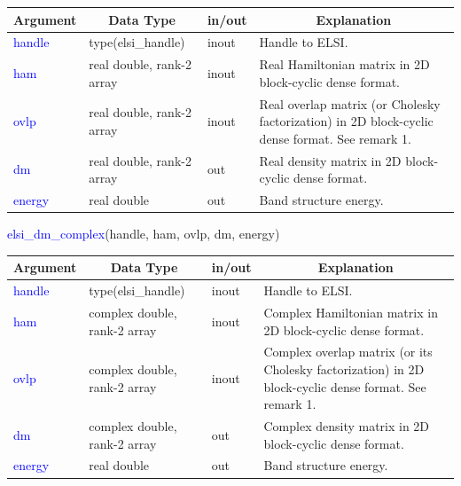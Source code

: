 \documentclass{report}
\begin{document}
\begin{tabular}[]{|p{20mm}|p{45mm}|p{15mm}|p{85mm}|}
\hline
\multicolumn{1}{|c|}{\textbf{Argument}} & \multicolumn{1}{c|}{\textbf{Data Type}} & \multicolumn{1}{c|}{\textbf{in/out}} & \multicolumn{1}{c|}{\textbf{Explanation}}\\
\hline
\textcolor{blue}{handle} & type(elsi\_handle)        & inout & Handle to ELSI.\\
\hline
\textcolor{blue}{ham}    & real double, rank-2 array & inout & Real Hamiltonian matrix in 2D block-cyclic dense format.\\
\hline
\textcolor{blue}{ovlp}   & real double, rank-2 array & inout & Real overlap matrix (or Cholesky factorization) in 2D block-cyclic dense format.  See remark 1.\\
\hline
\textcolor{blue}{dm}     & real double, rank-2 array & out   & Real density matrix in 2D block-cyclic dense format.\\
\hline
\textcolor{blue}{energy} & real double               & out   & Band structure energy.\\
\hline
\end{tabular}

\begin{labeling}{\hspace{6cm}}
\item [\hspace{0.3cm} \textcolor{blue}{elsi\_dm\_complex}(handle, ham, ovlp, dm, energy)]
\end{labeling}

\begin{tabular}[]{|p{20mm}|p{45mm}|p{15mm}|p{85mm}|}
\hline
\multicolumn{1}{|c|}{\textbf{Argument}} & \multicolumn{1}{c|}{\textbf{Data Type}} & \multicolumn{1}{c|}{\textbf{in/out}} & \multicolumn{1}{c|}{\textbf{Explanation}}\\
\hline
\textcolor{blue}{handle} & type(elsi\_handle)           & inout & Handle to ELSI.\\
\hline
\textcolor{blue}{ham}    & complex double, rank-2 array & inout & Complex Hamiltonian matrix in 2D block-cyclic dense format.\\
\hline
\textcolor{blue}{ovlp}   & complex double, rank-2 array & inout & Complex overlap matrix (or its Cholesky factorization) in 2D block-cyclic dense format.  See remark 1.\\
\hline
\textcolor{blue}{dm}     & complex double, rank-2 array & out   & Complex density matrix in 2D block-cyclic dense format.\\
\hline
\textcolor{blue}{energy} & real double                  & out   & Band structure energy.\\
\hline
\end{tabular}
\end{document}
